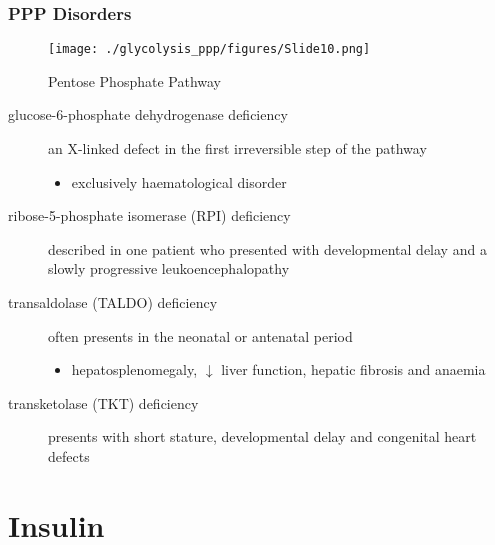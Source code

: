 \documentclass{scrartcl}
\begin{document}
\subsubsection{PPP Disorders}
\label{sec:org4e8f707}
\begin{figure}[htbp]
\centering
\texttt{[image: ./glycolysis\_ppp/figures/Slide10.png]}
\caption{\label{fig:orgfbd98ef}
Pentose Phosphate Pathway}
\end{figure}

\begin{description}
\item[{glucose-6-phosphate dehydrogenase deficiency}] an X-linked defect
in the first irreversible step of the pathway
\begin{itemize}
\item exclusively haematological disorder
\end{itemize}
\item[{ribose-5-phosphate isomerase (RPI) deficiency}] described in one
patient who presented with developmental delay and a slowly
progressive leukoencephalopathy
\item[{transaldolase (TALDO) deficiency}] often presents in the neonatal
or antenatal period
\begin{itemize}
\item hepatosplenomegaly, \(\downarrow\) liver function, hepatic fibrosis
and anaemia
\end{itemize}
\item[{transketolase (TKT) deficiency}] presents with short stature,
developmental delay and congenital heart defects
\end{description}
\section{Insulin}
\label{sec:org36cbcc5}
\end{document}

